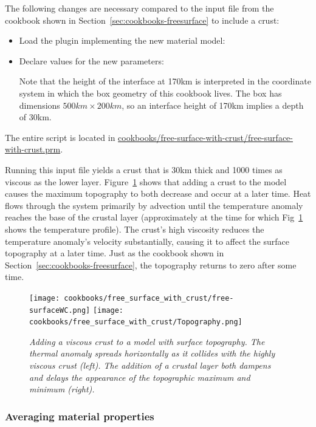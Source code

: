 \documentclass{article}
\begin{document}
The following changes are necessary compared to the input file from the
cookbook shown in Section~\ref{sec:cookbooks-freesurface} to include a crust:
\begin{itemize}
  \item Load the plugin implementing the new material model:
  
  
  \item Declare values for the new parameters:
  
  Note that the height of the interface at 170km is interpreted in the
  coordinate system in which the box geometry of this cookbook lives. The box
  has dimensions $500\si{km}\times 200\si{km}$, so an interface height of
  170km implies a depth of 30km.
\end{itemize}

The entire script is located in
\url{cookbooks/free-surface-with-crust/free-surface-with-crust.prm}.

Running this input file yields a
crust that is 30km thick and 1000 times as viscous as the lower layer.
Figure~\ref{fig:freesurfaceWC} shows that adding a crust to the model causes the maximum topography to both decrease and occur at a later time.
Heat flows through the system primarily by advection until the temperature anomaly reaches the base of the
crustal layer (approximately at the time for which Fig~\ref{fig:freesurfaceWC}
shows the temperature profile).
The crust's high viscosity reduces the temperature anomaly's velocity
substantially, causing it to affect the surface topography at a later time. Just
as the cookbook shown in Section~\ref{sec:cookbooks-freesurface}, the
topography returns to zero after some time.

\begin{figure}
  \centering
  \texttt{[image: cookbooks/free\_surface\_with\_crust/free-surfaceWC.png]}
  \hfill
  \texttt{[image: cookbooks/free\_surface\_with\_crust/Topography.png]}
  \caption{\it Adding a viscous crust to a model with surface topography. The
  thermal anomaly spreads horizontally as it collides with the highly viscous crust (left). The addition of a crustal layer both dampens and delays the appearance of the topographic maximum and minimum (right). }
  \label{fig:freesurfaceWC}
\end{figure}


\subsubsection{Averaging material properties}
\label{sec:sinker-with-averaging}
\end{document}
